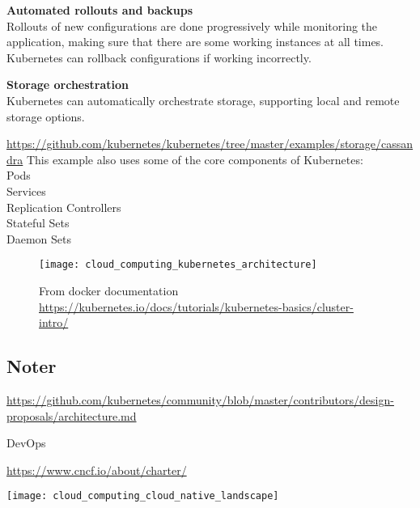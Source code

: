 \textbf{Automated rollouts and backups}\\
Rollouts of new configurations are done progressively while monitoring the application, making sure that there are some working instances at all times. Kubernetes can rollback configurations if working incorrectly.

\textbf{Storage orchestration}\\
Kubernetes can automatically orchestrate storage, supporting local and remote storage options.


\url{https://github.com/kubernetes/kubernetes/tree/master/examples/storage/cassandra}  
This example also uses some of the core components of Kubernetes:\\
Pods\\
Services\\
Replication Controllers\\
Stateful Sets\\
Daemon Sets\\

\begin{figure}[!htb]
	\centering 
		 \texttt{[image: cloud\_computing\_kubernetes\_architecture]}
	  \caption{From docker documentation \url{https://kubernetes.io/docs/tutorials/kubernetes-basics/cluster-intro/}}
  \label{fig:cloud_computing_kubernetes_architecture}
\end{figure}

\subsection*{Noter}
\url{https://github.com/kubernetes/community/blob/master/contributors/design-proposals/architecture.md}

DevOps

\url{https://www.cncf.io/about/charter/}




\texttt{[image: cloud\_computing\_cloud\_native\_landscape]}

%
%